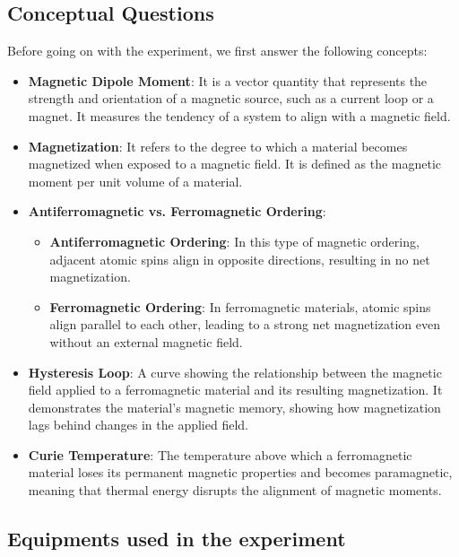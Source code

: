 \documentclass[12pt, a4paper, oneside]{article}
\begin{document}
\subsection{Conceptual Questions}
\indent

Before going on with the experiment, we first answer the following concepts: 

\begin{itemize}
    \item \textbf{Magnetic Dipole Moment}: It is a vector quantity that represents the strength and orientation of a magnetic source, such as a current loop or a magnet. It measures the tendency of a system to align with a magnetic field.

    \item \textbf{Magnetization}: It refers to the degree to which a material becomes magnetized when exposed to a magnetic field. It is defined as the magnetic moment per unit volume of a material.

    \item \textbf{Antiferromagnetic vs. Ferromagnetic Ordering}:
    \begin{itemize}
        \item \textbf{Antiferromagnetic Ordering}: In this type of magnetic ordering, adjacent atomic spins align in opposite directions, resulting in no net magnetization.
        \item \textbf{Ferromagnetic Ordering}: In ferromagnetic materials, atomic spins align parallel to each other, leading to a strong net magnetization even without an external magnetic field.
    \end{itemize}

    \item \textbf{Hysteresis Loop}: A curve showing the relationship between the magnetic field applied to a ferromagnetic material and its resulting magnetization. It demonstrates the material's magnetic memory, showing how magnetization lags behind changes in the applied field.

    \item \textbf{Curie Temperature}: The temperature above which a ferromagnetic material loses its permanent magnetic properties and becomes paramagnetic, meaning that thermal energy disrupts the alignment of magnetic moments.
\end{itemize}

\subsection{Equipments used in the experiment}
\indent
\end{document}
